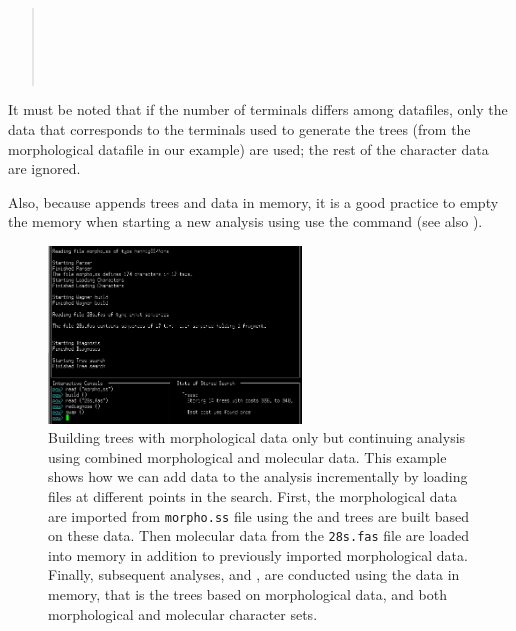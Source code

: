 \begin{quote}
\\
\\
\\
\\
\end{quote}

It must be noted that if the number of terminals differs among datafiles, only the data that corresponds to the terminals used to generate the trees (from the morphological datafile in our example) are used; the rest of the character data are ignored.

Also, because \poy appends trees and data in memory, it is a good practice to empty the memory when starting a new analysis using use the  command (see also ).

\begin{figure}[]
    \begin{center}
        \includegraphics[width=0.6\textwidth]{figures/reading_example2.jpg}
    \end{center}
    \caption{Building trees with morphological data only but continuing analysis using combined morphological and molecular data. This example shows how we can add data to the analysis incrementally by loading files at different points in the search. First, the morphological data are imported from \texttt{morpho.ss} file using  the and trees are built based on these data. Then molecular data from the \texttt{28s.fas} file are loaded into memory in addition to previously imported morphological data. Finally, subsequent analyses,  and , are conducted using the data in memory, that is the trees based on morphological data, and both morphological and molecular character sets.}
    \label{fig:reading_example2}
\end{figure}

